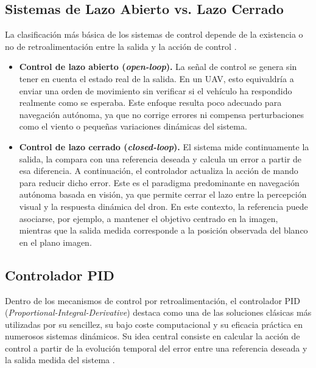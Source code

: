 \vspace{0.3cm}

\subsection{Sistemas de Lazo Abierto vs. Lazo Cerrado}

La clasificación más básica de los sistemas de control depende de la existencia o no de retroalimentación entre la salida y la acción de control \cite{DewesoftPID, WikipediaControladorPID}.

\vspace{0.3cm}

\begin{itemize}
    \item \textbf{Control de lazo abierto (\textit{open-loop}).} La señal de control se genera sin tener en cuenta el estado real de la salida. En un UAV, esto equivaldría a enviar una orden de movimiento sin verificar si el vehículo ha respondido realmente como se esperaba. Este enfoque resulta poco adecuado para navegación autónoma, ya que no corrige errores ni compensa perturbaciones como el viento o pequeñas variaciones dinámicas del sistema.

    \item \textbf{Control de lazo cerrado (\textit{closed-loop}).} El sistema mide continuamente la salida, la compara con una referencia deseada y calcula un error a partir de esa diferencia. A continuación, el controlador actualiza la acción de mando para reducir dicho error. Este es el paradigma predominante en navegación autónoma basada en visión, ya que permite cerrar el lazo entre la percepción visual y la respuesta dinámica del dron. En este contexto, la referencia puede asociarse, por ejemplo, a mantener el objetivo centrado en la imagen, mientras que la salida medida corresponde a la posición observada del blanco en el plano imagen.
\end{itemize}

\vspace{0.3cm}

\subsection{Controlador PID}
\vspace{0.3cm}

Dentro de los mecanismos de control por retroalimentación, el controlador PID (\textit{Proportional-Integral-Derivative}) destaca como una de las soluciones clásicas más utilizadas por su sencillez, su bajo coste computacional y su eficacia práctica en numerosos sistemas dinámicos. Su idea central consiste en calcular la acción de control a partir de la evolución temporal del error entre una referencia deseada y la salida medida del sistema \cite{DewesoftPID, WikipediaControladorPID}.

